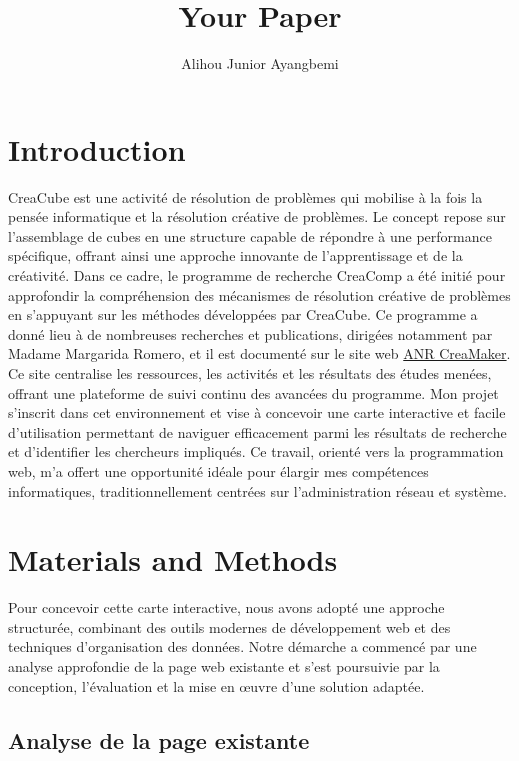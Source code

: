 \documentclass{article}
\title{Your Paper}
\author{Alihou Junior Ayangbemi}
\begin{document}
\maketitle

\tableofcontents
\newpage

\section{Introduction}


CreaCube est une activité de résolution de problèmes qui mobilise à la fois la pensée informatique et la résolution créative de problèmes. Le concept repose sur l'assemblage de cubes en une structure capable de répondre à une performance spécifique, offrant ainsi une approche innovante de l'apprentissage et de la créativité.
Dans ce cadre, le programme de recherche CreaComp a été initié pour approfondir la compréhension des mécanismes de résolution créative de problèmes en s'appuyant sur les méthodes développées par CreaCube. Ce programme a donné lieu à de nombreuses recherches et publications, dirigées notamment par Madame Margarida Romero, et il est documenté sur le site web  \href{https://creamaker.wordpress.com}{ANR CreaMaker}. Ce site centralise les ressources, les activités et les résultats des études menées, offrant une plateforme de suivi continu des avancées du programme.
Mon projet s’inscrit dans cet environnement et vise à concevoir une carte interactive et facile d’utilisation permettant de naviguer efficacement parmi les résultats de recherche et d’identifier les chercheurs impliqués. Ce travail, orienté vers la programmation web, m’a offert une opportunité idéale pour élargir mes compétences informatiques, traditionnellement centrées sur l’administration réseau et système.



\section{Materials and Methods}


Pour concevoir cette carte interactive, nous avons adopté une approche structurée, combinant des outils modernes de développement web et des techniques d'organisation des données. Notre démarche a commencé par une analyse approfondie de la page web existante et s’est poursuivie par la conception, l’évaluation et la mise en œuvre d’une solution adaptée.

\subsection{Analyse de la page existante}
\end{document}
